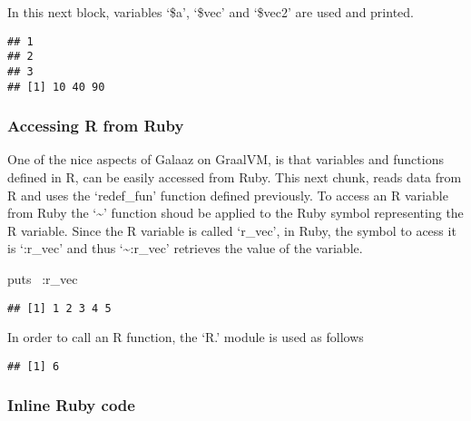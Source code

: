 \documentclass[]{article}
\newenvironment{Shaded}{\begin{snugshade}}{\end{snugshade}}
\newcommand{\DataTypeTok}[1]{\textcolor[rgb]{0.13,0.29,0.53}{#1}}
\newcommand{\StringTok}[1]{\textcolor[rgb]{0.31,0.60,0.02}{#1}}
\newcommand{\NormalTok}[1]{#1}
\begin{document}
In this next block, variables `\$a', `\$vec' and `\$vec2' are used and
printed.

\begin{Shaded}
\end{Shaded}

\begin{verbatim}
## 1
## 2
## 3
## [1] 10 40 90
\end{verbatim}

\subsubsection{Accessing R from Ruby}\label{accessing-r-from-ruby}

One of the nice aspects of Galaaz on GraalVM, is that variables and
functions defined in R, can be easily accessed from Ruby. This next
chunk, reads data from R and uses the `redef\_fun' function defined
previously. To access an R variable from Ruby the `\textasciitilde{}'
function shoud be applied to the Ruby symbol representing the R
variable. Since the R variable is called `r\_vec', in Ruby, the symbol
to acess it is `:r\_vec' and thus `\textasciitilde{}:r\_vec' retrieves
the value of the variable.

\begin{Shaded}
\begin{Highlighting}[]
\NormalTok{puts ~}\StringTok{:r_vec}
\end{Highlighting}
\end{Shaded}

\begin{verbatim}
## [1] 1 2 3 4 5
\end{verbatim}

In order to call an R function, the `R.' module is used as follows

\begin{Shaded}
\end{Shaded}

\begin{verbatim}
## [1] 6
\end{verbatim}

\subsubsection{Inline Ruby code}\label{inline-ruby-code}
\end{document}
